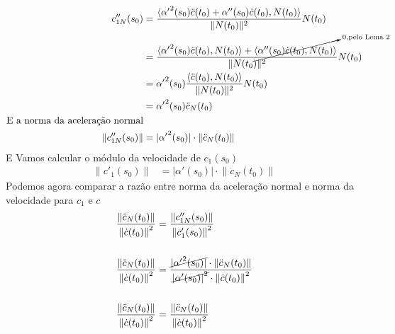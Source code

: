 \documentclass[12pt,letterpaper]{article}
\begin{document}
\begin{align*}
  c''_{1N}(s_0) &= \frac{\langle {\alpha'}^2(s_0)\ddot{c}(t_0) + \alpha''(s_0)\dot{c}(t_0),N(t_0) \rangle}{\lVert N(t_0) \rVert ^2}N(t_0)\\
  &= \frac{\langle {\alpha'}^2(s_0)\ddot{c}(t_0),N(t_0) \rangle + \cancelto{0, \text{pelo Lema 2}}{\langle {\alpha''}(s_0)\dot{c}(t_0),N(t_0) \rangle}}{\lVert N(t_0) \rVert ^2}N(t_0)\\
  &= {\alpha'}^2(s_0)\frac{ \langle \ddot{c}(t_0),N(t_0) \rangle}{\lVert N(t_0) \rVert ^2}N(t_0)\\
  &= {\alpha'}^2(s_0) \ddot{c}_N(t_0)\\
  \text{E a norma da aceleração normal}\\
  \lVert c''_{1N}(s_0) \rVert &= \lvert {\alpha'}^2(s_0)\rvert \cdot \lVert \ddot{c}_N(t_0) \rVert
\end{align*}
E Vamos calcular o módulo da velocidade de \(c_1(s_0)\)
\begin{align*}
  \lVert c'_1(s_0) \rVert &= \lvert {\alpha'}(s_0)\rvert \cdot \lVert \dot{c}_N(t_0) \rVert
\end{align*}
Podemos agora comparar a razão entre norma da aceleração normal e norma da velocidade para \(c_1\) e \(c\)
\begin{align*}
  \frac{\lVert \ddot{c}_N(t_0)\rVert}{{\lVert \dot{c}(t_0) \rVert}^2} &= \frac{\lVert c''_{1N}(s_0)\rVert}{{\lVert c'_1(s_0) \rVert}^2}\\ \\
  \frac{\lVert \ddot{c}_N(t_0)\rVert}{{\lVert \dot{c}(t_0) \rVert}^2} &= \frac{\cancel{\lvert {\alpha'}^2(s_0)\rvert} \cdot \lVert \ddot{c}_N(t_0) \rVert}{\cancel{{\lvert {\alpha'}(s_0)\rvert}^2} \cdot {\lVert \dot{c}(t_0) \rVert}^2} \\ \\
  \frac{\lVert \ddot{c}_N(t_0)\rVert}{{\lVert \dot{c}(t_0) \rVert}^2} &= \frac{\lVert \ddot{c}_N(t_0) \rVert}{{\lVert \dot{c}(t_0) \rVert}^2}
\end{align*}
\end{document}
